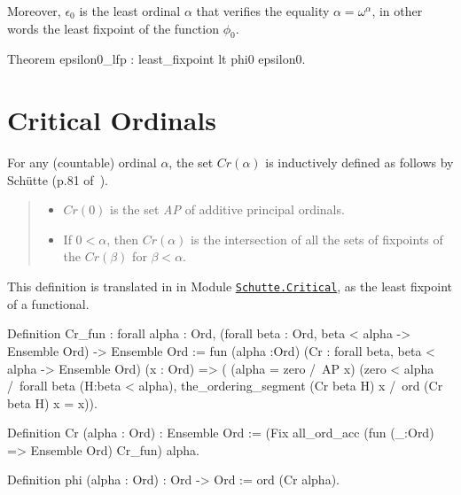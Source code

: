{Moreover,  $\epsilon_0$ is the least ordinal $\alpha$ that verifies the equality 
$\alpha = \omega^\alpha$, in other words the least fixpoint of the function  $\phi_0$.

\begin{Coqsrc}
Theorem epsilon0_lfp : least_fixpoint lt phi0 epsilon0.
\end{Coqsrc}


\section{Critical Ordinals}


For any  (countable) ordinal $\alpha$, the set $\textit{Cr}(\alpha)$ is inductively defined 
as follows by Schütte (p.81 of~\cite{schutte}).

\begin{quote}
  \begin{itemize}
  \item $\textit{Cr}(0)$ is the set \textit{AP} of additive principal ordinals.
  \item If $0<\alpha$, then $\textit{Cr}(\alpha)$ is the intersection of all the sets of fixpoints of the $\textit{Cr}(\beta)$ for $\beta<\alpha$.
  \end{itemize}
\end{quote}

This definition is translated in \coq{} in 
Module \href{../theories/html/hydras.Schutte.Critical.html}%
{\texttt{Schutte.Critical}}, as the least fixpoint of a functional. 


\begin{Coqsrc}
Definition Cr_fun : forall alpha : Ord,
       (forall beta : Ord, beta < alpha -> Ensemble Ord) ->
        Ensemble Ord 
:= 
   fun (alpha :Ord)
        (Cr : forall beta, 
                beta < alpha -> Ensemble Ord) 
        (x : Ord) => (
       (alpha = zero /\ AP x) \/
       (zero < alpha /\
        forall beta (H:beta < alpha),
          the_ordering_segment (Cr beta H) x /\ ord (Cr  beta H) x = x)).

Definition Cr (alpha : Ord) : Ensemble Ord := 
    (Fix  all_ord_acc (fun (_:Ord) => Ensemble Ord) Cr_fun) alpha.
\end{Coqsrc}

\label{sect:phi-schutte}

\begin{Coqsrc}
Definition phi (alpha : Ord) : Ord -> Ord 
    :=  ord (Cr alpha).


\end{Coqsrc}}
